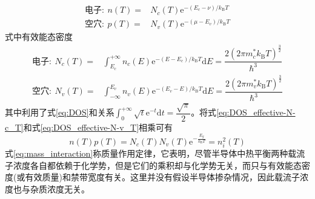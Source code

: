 \begin{subequations}
	\begin{align}
		\mbox{电子}:~n(T)=&N_c(T)\mathrm{e}^{-(E_c-\nu)/k_{\mathrm{B}}T}\label{eq:density_detail-n_T}\\
		\mbox{空穴}:~p(T)=&N_v(T)\mathrm{e}^{-(\mu-E_v)/k_{\mathrm{B}}T} \label{eq:density_detail-p_T}
	\end{align}
	\label{eq:density_detail}
\end{subequations} 
式中有效能态密度
\begin{subequations}
	\begin{align}
		\mbox{电子}:~N_c(T)=&\int_{E_c}^{+\infty}n_c(E)\mathrm{e}^{-(E-E_c)/k_{\mathrm{B}}T}\mathrm{d}E=\dfrac{2(2\pi m_c^{\ast}k_{\mathrm{B}}T)^{\frac32}}{\hbar^3}\label{eq:DOS_effective-N-c_T}\\
		\mbox{空穴}:~N_v(T)=&\int_{-\infty}^{E_v}n_v(E)\mathrm{e}^{-(E_v-E)/k_{\mathrm{B}}T}\mathrm{d}E=\dfrac{2(2\pi m_v^{\ast}k_{\mathrm{B}}T)^{\frac32}}{\hbar^3} \label{eq:DOS_effective-N-v_T}
	\end{align}
	\label{eq:DOS_effective}
\end{subequations} 
其中利用了式\eqref{eq:DOS}和关系$\int_0^{+\infty}\sqrt{t}\mathrm{e}^{-t}\mathrm{d}t=\dfrac{\sqrt{\pi}}2$。将式\eqref{eq:DOS_effective-N-c_T}和式\eqref{eq:DOS_effective-N-v_T}相乘可有
\begin{equation}
	n(T)p(T)=N_c(T)N_v(T)\mathrm{e}^{-\frac{E_g}{k_{\mathrm{B}}T}}=n_i^2(T)
	\label{eq:mass_interaction}
\end{equation}
式\eqref{eq:mass_interaction}称质量作用定律，它表明，尽管半导体中热平衡两种载流子浓度各自都依赖于化学势，但是它们的乘积却与化学势无关，而只与有效能态密度(或有效质量)和禁带宽度有关。这里并没有假设半导体掺杂情况，因此载流子浓度也与杂质浓度无关。

